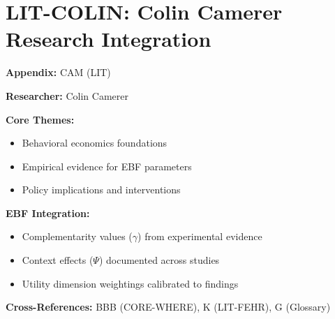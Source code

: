 %
%

\chapter{LIT-COLIN: Colin Camerer Research Integration}
\label{app:cam}

\begin{abstract}
This appendix integrates the research contributions of Colin Camerer into the
Evidence-Based Framework. It documents key papers, core findings, and their
integration with EBF dimensions including complementarity parameters ($\gamma$),
context factors ($\Psi$), and utility dimensions.
\end{abstract}

\begin{tcolorbox}[colback=blue!5!white, colframe=blue!75!black,
    title=Quick Reference: Colin Camerer Research]

\textbf{Appendix:} CAM (LIT)

\textbf{Researcher:} Colin Camerer

\textbf{Core Themes:}
\begin{itemize}[nosep]
\item Behavioral economics foundations
\item Empirical evidence for EBF parameters
\item Policy implications and interventions
\end{itemize}

\textbf{EBF Integration:}
\begin{itemize}[nosep]
\item Complementarity values ($\gamma$) from experimental evidence
\item Context effects ($\Psi$) documented across studies
\item Utility dimension weightings calibrated to findings
\end{itemize}

\textbf{Cross-References:} BBB (CORE-WHERE), K (LIT-FEHR), G (Glossary)
\end{tcolorbox}

